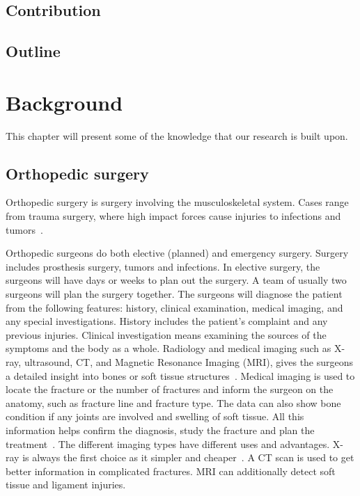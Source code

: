 \documentclass[a4paper]{report}
\begin{document}
\section{Contribution}
\section{Outline}

\chapter{Background}\label{Background}
This chapter will present some of the knowledge that our research is built upon.

\section{Orthopedic surgery}

Orthopedic surgery is surgery involving the musculoskeletal system. Cases range from trauma surgery, where high impact forces cause injuries to infections and tumors~\cite{swiontkowski_manual_2013}.

Orthopedic surgeons do both elective (planned) and emergency surgery. Surgery includes prosthesis surgery, tumors and infections.
In elective surgery, the surgeons will have days or weeks to plan out the surgery. A team of usually two surgeons will plan the surgery together.
The surgeons will diagnose the patient from the following features: history, clinical examination, medical imaging, and any special investigations. History includes the patient's complaint and any previous injuries. Clinical investigation means examining the sources of the symptoms and the body as a whole. Radiology and medical imaging such as X-ray, ultrasound, CT, and Magnetic Resonance Imaging (MRI), gives the surgeons a detailed insight into bones or soft tissue structures~\cite{swiontkowski_manual_2013}.
Medical imaging is used to locate the fracture or the number of fractures and inform the surgeon on the anatomy, such as fracture line and fracture type.
The data can also show bone condition if any joints are involved and swelling of soft tissue. All this information helps confirm the diagnosis, study the fracture and plan the treatment~\cite{ebnezar_textbook_2016}.
The different imaging types have different uses and advantages.
X-ray is always the first choice as it simpler and cheaper~\cite{ebnezar_textbook_2016}.
A CT scan is used to get better information in complicated fractures. MRI can additionally detect soft tissue and ligament injuries.
\end{document}
